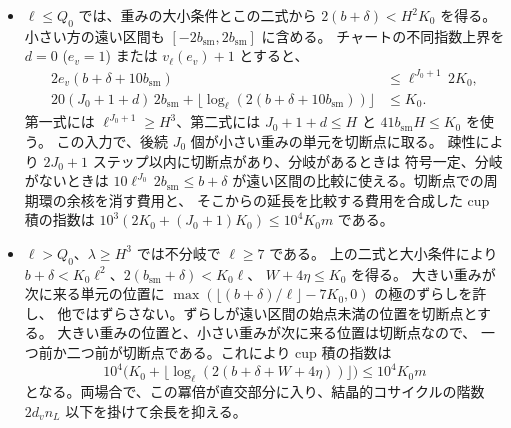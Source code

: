 \begin{itemize}
\item \(\ell\le Q_0\) では、重みの大小条件とこの二式から
\(2(b+\delta)<H^2K_0\) を得る。小さい方の遠い区間も
\([-2b_{\mathrm{sm}},2b_{\mathrm{sm}}]\) に含める。
チャートの不同指数上界を \(d=0\) (\(e_v=1\)) または \(v_\ell(e_v)+1\) とすると、
\[
 \begin{split}
 2e_v(b+\delta+10b_{\mathrm{sm}})&\le
       \ell^{J_0+1}\,2K_0,\\
 20(J_0+1+d)\,2b_{\mathrm{sm}}+
       \lfloor\log_\ell(2(b+\delta+10b_{\mathrm{sm}}))\rfloor&\le K_0 .
 \end{split}
\]
第一式には \(\ell^{J_0+1}\ge H^3\)、第二式には
\(J_0+1+d\le H\) と \(41 b_{\mathrm{sm}} H\le K_0\) を使う。
この入力で、後続 \(J_0\) 個が小さい重みの単元を切断点に取る。
疎性により \(2J_0+1\) ステップ以内に切断点があり、分岐があるときは
符号一定、分岐がないときは \(10\ell^{J_0}\,2b_{\mathrm{sm}}\le b+\delta\)
が遠い区間の比較に使える。切断点での周期環の余核を消す費用と、
そこからの延長を比較する費用を合成した cup 積の指数は
\(10^3(2K_0+(J_0+1)K_0)\le10^4K_0m\) である。

\item \(\ell>Q_0\)、\(\lambda\ge H^3\) では不分岐で \(\ell\ge7\) である。
上の二式と大小条件により
\(b+\delta<K_0\ell^2\)、\(2(b_{\mathrm{sm}}+\delta)<K_0\ell\)、
\(W+4\eta\le K_0\) を得る。
大きい重みが次に来る単元の位置に
\(\max(\lfloor(b+\delta)/\ell\rfloor-7K_0,0)\) の極のずらしを許し、
他ではずらさない。ずらしが遠い区間の始点未満の位置を切断点とする。
大きい重みの位置と、小さい重みが次に来る位置は切断点なので、
一つ前か二つ前が切断点である。これにより cup 積の指数は
\[
 10^4\bigl(K_0+\lfloor\log_\ell(2(b+\delta+W+4\eta))\rfloor\bigr)
 \le 10^4K_0m
\]
となる。両場合で、この冪倍が直交部分に入り、結晶的コサイクルの階数
\(2d_v n_L\) 以下を掛けて余長を抑える。


\end{itemize}
